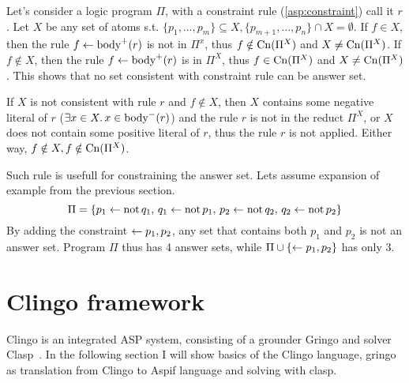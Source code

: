 \documentclass[
    digital,
    color,
    oneside,
    sansbold,
    lot,
    nolof
]{fithesis}
\begin{document}

Let's consider a logic program $\Pi$, with a constraint rule (\ref{asp:constraint}) call it $r$.
Let $X$ be any set of atoms s.t. $\{p_1, \dots, p_m\}\subseteq X,
\{p_{m+1}, \dots, p_n\}\cap X = \emptyset$. If $f\in X$, then the rule
$f \leftarrow{} \mathrm{body}^+(r)$ is not in $\Pi^x$, thus $f\notin \mathrm{Cn}(\Pi^X)$
and $X \neq \mathrm{Cn}(\Pi^X)$. If $f\notin X$, then the rule
$f \leftarrow{} \mathrm{body}^+(r)$ is in $\Pi^X$, thus $f\in \mathrm{Cn}(\Pi^X)$
and $X\neq \mathrm{Cn}(\Pi^X)$. This shows that no set consistent with constraint
rule can be answer set.

If $X$ is not consistent with rule $r$ and $f\notin X$,
then $X$ contains some negative literal
of $r$ ($\exists x\in X.\, x\in \mathrm{body}^-(r)$) and the rule $r$ is not in the
reduct $\Pi^X$, or $X$ does not contain some positive literal of $r$, thus the
rule $r$ is not applied. Either way, $f\notin X, f\notin \mathrm{Cn}(\Pi^X)$.

Such rule is usefull for constraining the answer set. Lets assume expansion
of example from the previous section.
\begin{equation*}
    \Pi = \{
        p_1 \leftarrow{} \mathrm{not}\, q_1,\, q_1 \leftarrow{} \mathrm{not}\, p_1,\,
        p_2 \leftarrow{} \mathrm{not}\, q_2,\, q_2 \leftarrow{} \mathrm{not}\, p_2
    \}
\end{equation*}
By adding the constraint $\leftarrow{} p_1, p_2$, any set that contains both
$p_1$ and $p_2$ is not an answer set. Program $\Pi$ thus has 4 answer sets,
while $\Pi\cup \{\leftarrow{} p_1, p_2\}$ has only 3.

\section{Clingo framework}

Clingo is an integrated ASP system, consisting of a grounder Gringo and solver
Clasp~\cite{aspEasy2016}. In the following section I will show basics of the
Clingo language, gringo as translation from Clingo to Aspif language and
solving with clasp.
\end{document}
